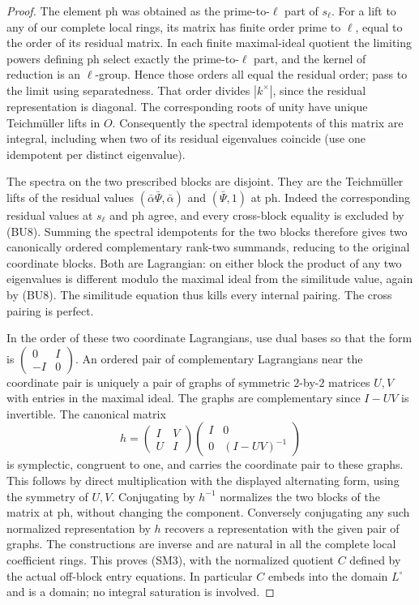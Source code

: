 \begin{proof}
The element \(\mathrm{ph}\) was obtained as the
prime-to-\(\ell\) part of \(s_\ell\). For a lift
to any of our complete local rings, its matrix has
finite order prime to \(\ell\), equal to the order
of its residual matrix. In each finite maximal-ideal
quotient the limiting powers defining \(\mathrm{ph}\)
select exactly the prime-to-\(\ell\) part, and the
kernel of reduction is an \(\ell\)-group. Hence those
orders all equal the residual order; pass to the
limit using separatedness. That order divides
\(|k^\times|\), since the residual
representation is diagonal. The corresponding roots
of unity have unique Teichm\"uller lifts in \(O\).
Consequently the spectral idempotents of this matrix
are integral, including when two of its residual
eigenvalues coincide (use one idempotent per distinct
eigenvalue).

The spectra on the two prescribed blocks are disjoint.
They are the Teichm\"uller lifts of the residual
values \((\bar\alpha\bar\Psi,\bar\alpha)\) and
\((\bar\Psi,1)\) at \(\mathrm{ph}\).
Indeed the corresponding residual values at
\(s_\ell\) and \(\mathrm{ph}\) agree, and every
cross-block equality is excluded by (BU8).
Summing the spectral idempotents for the two blocks
therefore gives two canonically ordered complementary
rank-two summands, reducing to the original coordinate
blocks. Both are Lagrangian: on either block the
product of any two eigenvalues is different modulo
the maximal ideal from the similitude value, again
by (BU8). The similitude equation thus kills every
internal pairing. The cross pairing is perfect.

In the order of these two coordinate Lagrangians,
use dual bases so that the form is
\(\left(\begin{smallmatrix}0&I\\-I&0\end{smallmatrix}\right)\).
An ordered pair of complementary Lagrangians near
the coordinate pair is uniquely a pair of graphs
of symmetric \(2\)-by-\(2\) matrices \(U,V\) with
entries in the maximal ideal. The graphs are complementary
since \(I-UV\) is invertible. The canonical matrix
\[
 h=\begin{pmatrix}I&V\\U&I\end{pmatrix}
                \begin{pmatrix}I&0\\0&(I-UV)^{-1}\end{pmatrix}
                                                               \tag{SM6}
\]
is symplectic, congruent to one, and carries the
coordinate pair to these graphs. This follows
by direct multiplication with the displayed alternating
form, using the symmetry of \(U,V\).
Conjugating by \(h^{-1}\) normalizes the two blocks
of the matrix at \(\mathrm{ph}\), without changing
the component. Conversely conjugating any such
normalized representation by \(h\) recovers a
representation with the given pair of graphs.
The constructions are inverse and are natural in
all the complete local coefficient rings. This
proves (SM3), with the normalized quotient \(C\)
defined by the actual off-block entry equations.
In particular \(C\) embeds into the domain \(L^\circ\)
and is a domain; no integral saturation is involved.


\end{proof}
